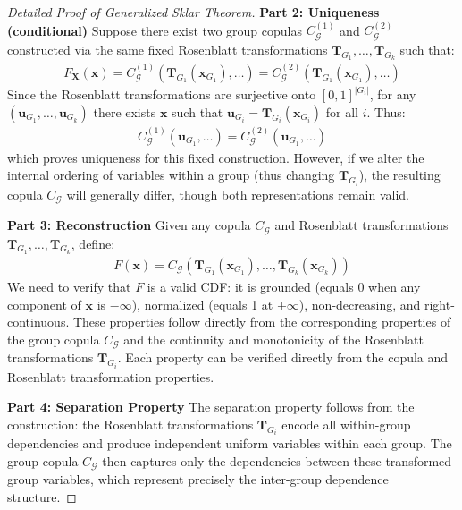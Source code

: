 \begin{proof}[Detailed Proof of Generalized Sklar Theorem]
\textbf{Part 2: Uniqueness (conditional)}
Suppose there exist two group copulas $C_{\mathcal{G}}^{(1)}$ and $C_{\mathcal{G}}^{(2)}$ constructed via the same fixed Rosenblatt transformations $\mathbf{T}_{G_1}, \dots, \mathbf{T}_{G_k}$ such that:
\begin{align}
F_{\mathbf{X}}(\mathbf{x}) = C_{\mathcal{G}}^{(1)}(\mathbf{T}_{G_1}(\mathbf{x}_{G_1}), \ldots) = C_{\mathcal{G}}^{(2)}(\mathbf{T}_{G_1}(\mathbf{x}_{G_1}), \ldots)
\end{align}
Since the Rosenblatt transformations are surjective onto $[0,1]^{|G_i|}$, for any $(\mathbf{u}_{G_1}, \ldots, \mathbf{u}_{G_k})$ there exists $\mathbf{x}$ such that $\mathbf{u}_{G_i} = \mathbf{T}_{G_i}(\mathbf{x}_{G_i})$ for all $i$. Thus:
\begin{align}
C_{\mathcal{G}}^{(1)}(\mathbf{u}_{G_1}, \ldots) = C_{\mathcal{G}}^{(2)}(\mathbf{u}_{G_1}, \ldots)
\end{align}
which proves uniqueness for this fixed construction. However, if we alter the internal ordering of variables within a group (thus changing $\mathbf{T}_{G_i}$), the resulting copula $C_{\mathcal{G}}$ will generally differ, though both representations remain valid.

\textbf{Part 3: Reconstruction}
Given any copula $C_{\mathcal{G}}$ and Rosenblatt transformations $\mathbf{T}_{G_1}, \ldots, \mathbf{T}_{G_k}$, define:
\begin{align}
F(\mathbf{x}) = C_{\mathcal{G}}(\mathbf{T}_{G_1}(\mathbf{x}_{G_1}), \ldots, \mathbf{T}_{G_k}(\mathbf{x}_{G_k}))
\end{align}
We need to verify that $F$ is a valid CDF: it is grounded (equals 0 when any component of $\mathbf{x}$ is $-\infty$), normalized (equals 1 at $+\infty$), non-decreasing, and right-continuous. These properties follow directly from the corresponding properties of the group copula $C_{\mathcal{G}}$ and the continuity and monotonicity of the Rosenblatt transformations $\mathbf{T}_{G_i}$.
Each property can be verified directly from the copula and Rosenblatt transformation properties.

\textbf{Part 4: Separation Property}
The separation property follows from the construction: the Rosenblatt transformations $\mathbf{T}_{G_i}$ encode all within-group dependencies and produce independent uniform variables within each group. The group copula $C_{\mathcal{G}}$ then captures only the dependencies between these transformed group variables, which represent precisely the inter-group dependence structure.
\end{proof}

